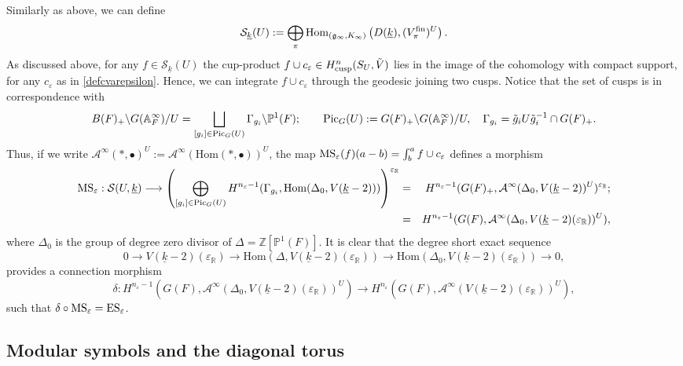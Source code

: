 \documentclass{amsart}
\theoremstyle{definition}
\theoremstyle{remark}
\numberwithin{equation}{section}
\newcommand{\Pic}{\mathrm{Pic}}
\newcommand{\Z}{{\mathbb Z}}
\newcommand{\A}{{\mathbb A}}
\newcommand{\R}{{\mathbb R}}
\newcommand{\PP}{{\mathbb P}}
\newcommand{\cA}{{\mathcal A}}
\newcommand{\cS}{{\mathcal S}}
\newcommand{\mfg}{{\mathfrak g}}
\newcommand{\Hom}{{\mathrm {Hom}}}
\begin{document}
Similarly as above, we can define
\[
\cS_{\underline k}(U):=\bigoplus_{\pi}\Hom_{(\mfg_\infty,K_\infty)}\left(D(\underline k),(V_\pi^{\rm fin})^U\right).
\]
As discussed above, for any $f\in \cS_{\underline k}(U)$ the cup-product $f\cup c_\varepsilon\in H^n_{\rm cusp}(S_U,\tilde V)$ lies in the image of the cohomology with compact support, for any $c_\varepsilon$ as in \eqref{defcvarepsilon}. Hence, we can integrate $f\cup c_\varepsilon$ through the geodesic joining two cusps. Notice that the set of cusps is in correspondence with
\[
B(F)_+\backslash G(\A_F^\infty)/U=\bigsqcup_{[g_i]\in \Pic_G(U)}\Gamma_{g_i}\backslash \PP^1(F);\qquad {\rm Pic}_G(U):=G(F)_+\backslash G(\A_F^\infty)\slash U,\quad 
\Gamma_{g_i}=\tilde g_iU \tilde g_i^{-1}\cap G(F)_+.
\]
Thus, if we write $\cA^\infty(\ast,\bullet)^U:=\cA^\infty(\Hom(\ast,\bullet))^U$, the map ${\rm MS}_\varepsilon(f)(a-b)=\int_b^af\cup c_\varepsilon$ defines a morphism %
\begin{eqnarray*}
{\rm MS}_\varepsilon:\cS(U,\underline k)\longrightarrow \left(\bigoplus_{[g_i]\in \Pic_G(U)}H^{n_\varepsilon-1}(\Gamma_{g_i},\Hom(\Delta_0,V(\underline k-2)))\right)^{\varepsilon_\R}&=&H^{n_\varepsilon-1}(G(F)_+,\cA^\infty(\Delta_0,V(\underline k-2))^U)^{\varepsilon_\R};\\ 
&=&H^{n_\varepsilon-1}(G(F),\cA^\infty(\Delta_0,V(\underline k-2)(\varepsilon_\R))^U),
\end{eqnarray*}
where $\Delta_0$ is the group of degree zero divisor of $\Delta=\Z[\PP^1(F)]$. It is clear that the degree short exact sequence
\[
0\longrightarrow V(\underline k-2)(\varepsilon_\R)\longrightarrow \Hom(\Delta,V(\underline k-2)(\varepsilon_\R))\longrightarrow \Hom(\Delta_0,V(\underline k-2)(\varepsilon_\R))\longrightarrow 0,
\]
provides a connection morphism
\[
\delta:H^{n_\varepsilon-1}(G(F),\cA^\infty(\Delta_0,V(\underline k-2)(\varepsilon_\R))^U)\longrightarrow H^{n_\varepsilon}(G(F),\cA^\infty(V(\underline k-2)(\varepsilon_\R))^U),
\]
such that $\delta\circ {\rm MS}_\varepsilon={\rm ES}_\varepsilon$.

\subsection{Modular symbols and the diagonal torus}\label{MSandDT}
\end{document}
